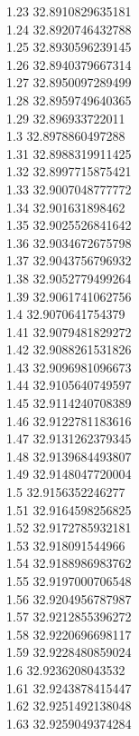 {1.23	32.8910829635181\\
1.24	32.8920746432788\\
1.25	32.8930596239145\\
1.26	32.8940379667314\\
1.27	32.8950097289499\\
1.28	32.8959749640365\\
1.29	32.896933722011\\
1.3	32.8978860497288\\
1.31	32.8988319911425\\
1.32	32.8997715875421\\
1.33	32.9007048777772\\
1.34	32.901631898462\\
1.35	32.9025526841642\\
1.36	32.9034672675798\\
1.37	32.9043756796932\\
1.38	32.9052779499264\\
1.39	32.9061741062756\\
1.4	32.9070641754379\\
1.41	32.9079481829272\\
1.42	32.9088261531826\\
1.43	32.9096981096673\\
1.44	32.9105640749597\\
1.45	32.9114240708389\\
1.46	32.9122781183616\\
1.47	32.9131262379345\\
1.48	32.9139684493807\\
1.49	32.9148047720004\\
1.5	32.9156352246277\\
1.51	32.9164598256825\\
1.52	32.9172785932181\\
1.53	32.918091544966\\
1.54	32.9188986983762\\
1.55	32.9197000706548\\
1.56	32.9204956787987\\
1.57	32.9212855396272\\
1.58	32.9220696698117\\
1.59	32.9228480859024\\
1.6	32.9236208043532\\
1.61	32.9243878415447\\
1.62	32.9251492138048\\
1.63	32.9259049374284\\
}
